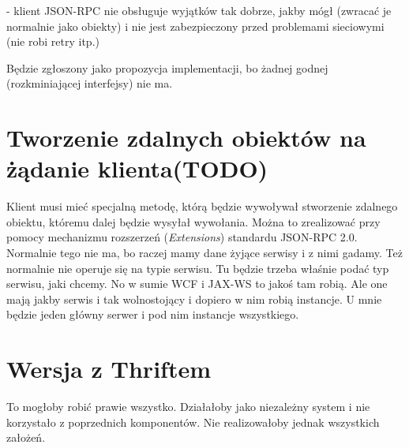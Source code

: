 - klient JSON-RPC nie obsługuje wyjątków tak dobrze, jakby mógł (zwracać je normalnie jako obiekty) i nie jest zabezpieczony przed problemami sieciowymi (nie robi retry itp.)

Będzie zgłoszony jako propozycja implementacji, bo żadnej godnej (rozkminiającej interfejsy) nie ma.



\section{Tworzenie zdalnych obiektów na żądanie klienta(TODO)}
Klient musi mieć specjalną metodę, którą będzie wywoływał stworzenie zdalnego obiektu, któremu dalej będzie wysyłał wywołania.
Można to zrealizować przy pomocy mechanizmu rozszerzeń (\emph{Extensions}) standardu JSON-RPC 2.0.
Normalnie tego nie ma, bo raczej mamy dane żyjące serwisy i z nimi gadamy. Też normalnie nie operuje się na typie serwisu. Tu będzie trzeba właśnie podać typ serwisu, jaki chcemy. No w sumie WCF i JAX-WS to jakoś tam robią. Ale one mają jakby serwis i tak wolnostojący i dopiero w nim robią instancje. U mnie będzie jeden główny serwer i pod nim instancje wszystkiego.



\section{Wersja z Thriftem}
To mogłoby robić prawie wszystko. Działałoby jako niezależny system i nie korzystało z poprzednich komponentów. Nie realizowałoby jednak wszystkich założeń.